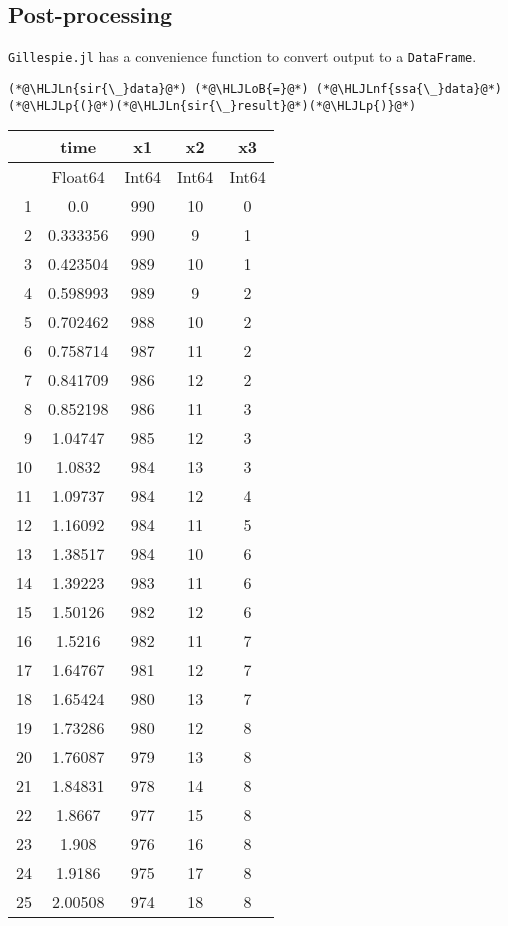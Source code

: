 \documentclass[12pt,a4paper]{article}
\newcommand{\HLJLn}[1]{#1}
\newcommand{\HLJLnf}[1]{\textcolor[RGB]{66,102,213}{#1}}
\newcommand{\HLJLoB}[1]{\textcolor[RGB]{102,102,102}{\textbf{#1}}}
\newcommand{\HLJLp}[1]{#1}
\begin{document}
\subsection{Post-processing}
\texttt{Gillespie.jl} has a convenience function to convert output to a \texttt{DataFrame}.


\begin{lstlisting}
(*@\HLJLn{sir{\_}data}@*) (*@\HLJLoB{=}@*) (*@\HLJLnf{ssa{\_}data}@*)(*@\HLJLp{(}@*)(*@\HLJLn{sir{\_}result}@*)(*@\HLJLp{)}@*)
\end{lstlisting}


\begin{tabular}{r|cccc}
	& time & x1 & x2 & x3\\
	\hline
	& Float64 & Int64 & Int64 & Int64\\
	\hline
	1 & 0.0 & 990 & 10 & 0 \\
	2 & 0.333356 & 990 & 9 & 1 \\
	3 & 0.423504 & 989 & 10 & 1 \\
	4 & 0.598993 & 989 & 9 & 2 \\
	5 & 0.702462 & 988 & 10 & 2 \\
	6 & 0.758714 & 987 & 11 & 2 \\
	7 & 0.841709 & 986 & 12 & 2 \\
	8 & 0.852198 & 986 & 11 & 3 \\
	9 & 1.04747 & 985 & 12 & 3 \\
	10 & 1.0832 & 984 & 13 & 3 \\
	11 & 1.09737 & 984 & 12 & 4 \\
	12 & 1.16092 & 984 & 11 & 5 \\
	13 & 1.38517 & 984 & 10 & 6 \\
	14 & 1.39223 & 983 & 11 & 6 \\
	15 & 1.50126 & 982 & 12 & 6 \\
	16 & 1.5216 & 982 & 11 & 7 \\
	17 & 1.64767 & 981 & 12 & 7 \\
	18 & 1.65424 & 980 & 13 & 7 \\
	19 & 1.73286 & 980 & 12 & 8 \\
	20 & 1.76087 & 979 & 13 & 8 \\
	21 & 1.84831 & 978 & 14 & 8 \\
	22 & 1.8667 & 977 & 15 & 8 \\
	23 & 1.908 & 976 & 16 & 8 \\
	24 & 1.9186 & 975 & 17 & 8 \\
	25 & 2.00508 & 974 & 18 & 8 \\

\end{tabular}
\end{document}
